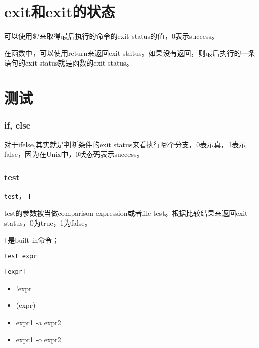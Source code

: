 \section{exit和exit的状态}

可以使用\$?来取得最后执行的命令的exit status的值，0表示success。


在函数中，可以使用return来返回exit status。如果没有返回，则最后执行的一条语句的exit status就是函数的exit status。

\section{测试}

\subsubsection{if, else}

对于ifelse,其实就是判断条件的exit status来看执行哪个分支，0表示真，1表示false，因为在Unix中，0状态码表示success。

\subsubsection{test}

\lstinline$test$， \lstinline$[$

test的参数被当做comparison expression或者file test。根据比较结果来返回exit status，0为true，1为false。

\lstinline$[$是built-in命令；

\lstinline$test expr$

\lstinline$[expr]$

\begin{itemize}
\item !expr
\item (expr)
\item expr1 -a expr2
\item expr1 -o expr2 
\end{itemize}

